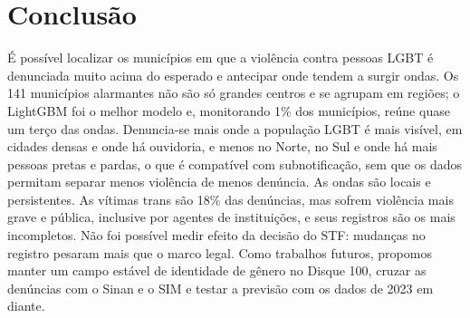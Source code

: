 \documentclass[12pt]{article}
\begin{document}
\section{Conclusão}
\label{sec:conclusao}

É possível localizar os municípios em que a violência contra pessoas LGBT é denunciada muito acima do esperado e antecipar onde tendem a surgir ondas. Os 141 municípios alarmantes não são só grandes centros e se agrupam em regiões; o LightGBM foi o melhor modelo e, monitorando 1\% dos municípios, reúne quase um terço das ondas. Denuncia-se mais onde a população LGBT é mais visível, em cidades densas e onde há ouvidoria, e menos no Norte, no Sul e onde há mais pessoas pretas e pardas, o que é compatível com subnotificação, sem que os dados permitam separar menos violência de menos denúncia. As ondas são locais e persistentes. As vítimas trans são 18\% das denúncias, mas sofrem violência mais grave e pública, inclusive por agentes de instituições, e seus registros são os mais incompletos. Não foi possível medir efeito da decisão do STF: mudanças no registro pesaram mais que o marco legal. Como trabalhos futuros, propomos manter um campo estável de identidade de gênero no Disque 100, cruzar as denúncias com o Sinan e o SIM e testar a previsão com os dados de 2023 em diante.




\end{document}
